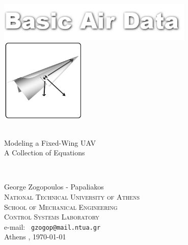 \begin{titlingpage}
\begin{center}

\includegraphics[width=0.7\textwidth]{./figures/BADLogo}~\\[1cm]
\includegraphics[width=0.3\textwidth]{./figures/aeroplanino}~\\[1cm]

\HRule \\
\linespread{1.5}
\begin{huge}
Modeling a Fixed-Wing UAV\\
A Collection of Equations\\

\par
\end{huge}
\HRule \\

\vfill

{\Large
George Zogopoulos - Papaliakos
} \\[0.3cm]
\textsc{\large 
National Technical University of Athens
}\\
\textsc{School of Mechanical Engineering\\ Control Systems Laboratory} \\[0.3cm]
e-mail: \texttt{
gzogop@mail.ntua.gr
} \\[1cm]
{
Athens
, \today}

	

\end{center}

\end{titlingpage}